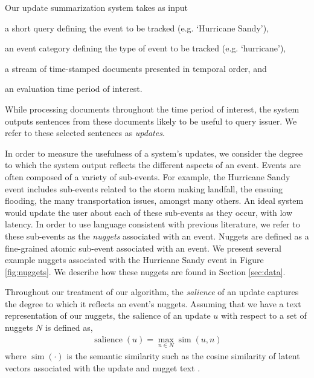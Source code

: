 
Our update summarization system takes as input 
\begin{enumerate*}[label=\itshape\alph*\upshape)]
  \item a short query defining the event to be tracked (e.g. `Hurricane Sandy'), 
  \item an event category defining the type of event to be tracked (e.g. `hurricane'), 
  \item a stream of time-stamped documents %
  presented in temporal order, and \item an evaluation time period of interest.
\end{enumerate*} 
While processing documents
throughout the time period of interest, the system outputs sentences
from these documents likely to be useful to query issuer.  We refer
to these selected sentences as \emph{updates}.

In order to measure the usefulness of a system's updates, we consider
the degree to which the system output reflects the different
aspects of an event.  Events are often composed of a variety of sub-events.  
For example, the Hurricane Sandy
event includes sub-events related to the storm making landfall,
the ensuing flooding, the many transportation issues, amongst many
others.  An ideal system would update the user about each of these
sub-events as they occur, with low latency.  In order to use
language consistent with previous literature, we refer to these
sub-events as the \emph{nuggets} associated with an event.  Nuggets are
defined as a fine-grained atomic sub-event associated with an event.  
We present several example nuggets associated with the Hurricane
Sandy event in Figure \ref{fig:nuggets}.  We describe how these 
nuggets are found in Section \ref{sec:data}.




Throughout our treatment of our algorithm, the \emph{salience} 
of an update captures the degree to which it reflects an 
event's nuggets.  Assuming that we have a text representation 
of our nuggets, the salience of an update $u$  with respect to a set of nuggets $N$ is
defined as,
\begin{align}
\operatorname{salience}(u) = \operatorname{max}_{n \in N} 
\operatorname{sim}(u, n) \label{eq:salience}
\end{align}
where $\operatorname{sim}(\cdot)$ is the semantic similarity such as
the cosine similarity of latent vectors associated with the update and 
nugget text \cite{?}. 

